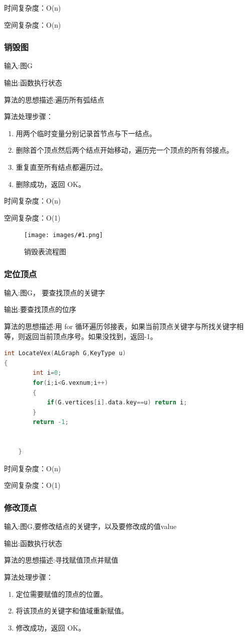 \documentclass[supercite]{Experimental_Report}
\newcommand{\cfig}[3]{
	\begin{figure}[htb]
		\centering
		\texttt{[image: images/\#1.png]}
		\caption{#3}
		\label{fig:#1}
	\end{figure}
}
\theoremstyle{definition}
\begin{document}
时间复杂度：O(n)

空间复杂度：O(n)


\subsubsection{销毁图}

输入:图G

输出:函数执行状态

算法的思想描述:遍历所有弧结点

算法处理步骤：
\begin{enumerate}
	\renewcommand{\labelenumi}{\theenumi)}
	\item 用两个临时变量分别记录首节点与下一结点。
	\item 删除首个顶点然后两个结点开始移动，遍历完一个顶点的所有邻接点。
	\item 重复直至所有结点都遍历过。
	\item 删除成功，返回 OK。
\end{enumerate}

时间复杂度：O(n)

空间复杂度：O(1)
\cfig{2.3.2}{0.8}{销毁表流程图}
\subsubsection{定位顶点}
输入:图G， 要查找顶点的关键字

输出:要查找顶点的位序

算法的思想描述:用 for 循环遍历邻接表，如果当前顶点关键字与所找关键字相等，则返回当前顶点序号。如果没找到，返回-1。
\begin{lstlisting}[language=C] 	
int LocateVex(ALGraph G,KeyType u)
{
		int i=0;
		for(i;i<G.vexnum;i++)
		{
			if(G.vertices[i].data.key==u) return i;
		}
		return -1;
		

	}
\end{lstlisting}

时间复杂度：O(n)

空间复杂度：O(1)
\subsubsection{修改顶点}
输入:图G,要修改结点的关键字，以及要修改成的值value

输出:函数执行状态

算法的思想描述:寻找赋值顶点并赋值

算法处理步骤：
\begin{enumerate}
	\renewcommand{\labelenumi}{\theenumi)}
	\item 定位需要赋值的顶点的位置。
	\item 将该顶点的关键字和值域重新赋值。
	\item 修改成功，返回 OK。
\end{enumerate}
\end{document}
